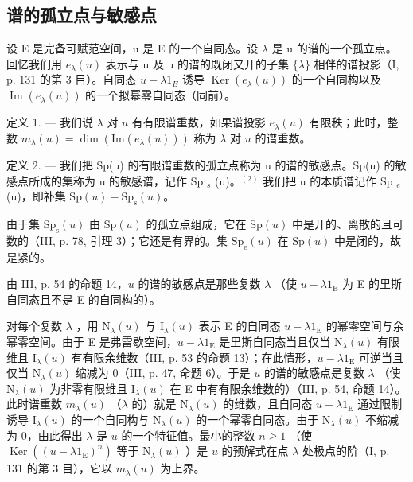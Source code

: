 \subsection{谱的孤立点与敏感点}

设 E 是完备可赋范空间，u 是 E 的一个自同态。设 \(\lambda\) 是 u 的谱的一个孤立点。回忆我们用 \(e_{\lambda}(u)\) 表示与 u 及 u 的谱的既闭又开的子集 \(\{\lambda\}\) 相伴的谱投影（I, p. 131 的第 3 目）。自同态 \(u - \lambda1_{E}\) 诱导 \(\operatorname{Ker}(e_{\lambda}(u))\) 的一个自同构以及 \(\operatorname{Im}(e_{\lambda}(u))\) 的一个拟幂零自同态（同前）。

定义 1. --- 我们说 \(\lambda\) 对 \(u\) 有有限谱重数，如果谱投影 \(e_{\lambda}(u)\) 有限秩；此时，整数 \(m_{\lambda}(u) = \dim (\mathrm{Im}(e_{\lambda}(u)))\) 称为 \(\lambda\) 对 \(u\) 的谱重数。

定义 2. --- 我们把 Sp(u) 的有限谱重数的孤立点称为 u 的谱的敏感点。Sp(u) 的敏感点所成的集称为 u 的敏感谱，记作 Sp \(_{s}\) (u)。\(^{(2)}\) 我们把 u 的本质谱记作 Sp \(_{e}\) (u)，即补集 \(\mathrm{Sp}(u) - \mathrm{Sp}_{\mathrm{s}}(u)\)。

由于集 \(\mathrm{Sp}_{\mathrm{s}}(u)\) 由 \(\mathrm{Sp}(u)\) 的孤立点组成，它在 \(\mathrm{Sp}(u)\) 中是开的、离散的且可数的（III, p. 78, 引理 3）；它还是有界的。集 \(\mathrm{Sp}_{\mathrm{e}}(u)\) 在 \(\mathrm{Sp}(u)\) 中是闭的，故是紧的。

由 III, p. 54 的命题 14，\(u\) 的谱的敏感点是那些复数 \(\lambda\) （使 \(u - \lambda 1_{\mathrm{E}}\) 为 E 的里斯自同态且不是 E 的自同构的）。

对每个复数 \(\lambda\) ，用 \(\mathrm{N}_{\lambda}(u)\) 与 \(\mathrm{I}_{\lambda}(u)\) 表示 E 的自同态 \(u - \lambda 1_{\mathrm{E}}\) 的幂零空间与余幂零空间。由于 E 是弗雷歇空间，\(u - \lambda 1_{\mathrm{E}}\) 是里斯自同态当且仅当 \(\mathrm{N}_{\lambda}(u)\) 有限维且 \(\mathrm{I}_{\lambda}(u)\) 有有限余维数（III, p. 53 的命题 13）；在此情形，\(u - \lambda 1_{\mathrm{E}}\) 可逆当且仅当 \(\mathrm{N}_{\lambda}(u)\) 缩减为 0（III, p. 47, 命题 6）。于是 \(u\) 的谱的敏感点是复数 \(\lambda\) （使 \(\mathrm{N}_{\lambda}(u)\) 为非零有限维且 \(\mathrm{I}_{\lambda}(u)\) 在 E 中有有限余维数的）（III, p. 54, 命题 14）。此时谱重数 \(m_{\lambda}(u)\) （\(\lambda\) 的）就是 \(\mathrm{N}_{\lambda}(u)\) 的维数，且自同态 \(u - \lambda 1_{\mathrm{E}}\) 通过限制诱导 \(\mathrm{I}_{\lambda}(u)\) 的一个自同构与 \(\mathrm{N}_{\lambda}(u)\) 的一个幂零自同态。由于 \(\mathrm{N}_{\lambda}(u)\) 不缩减为 0，由此得出 \(\lambda\) 是 \(u\) 的一个特征值。最小的整数 \(n \geqslant 1\) （使 \(\operatorname{Ker}((u - \lambda 1_{\mathrm{E}})^n)\) 等于 \(\mathrm{N}_{\lambda}(u)\) ）是 \(u\) 的预解式在点 \(\lambda\) 处极点的阶（I, p. 131 的第 3 目），它以 \(m_{\lambda}(u)\) 为上界。

